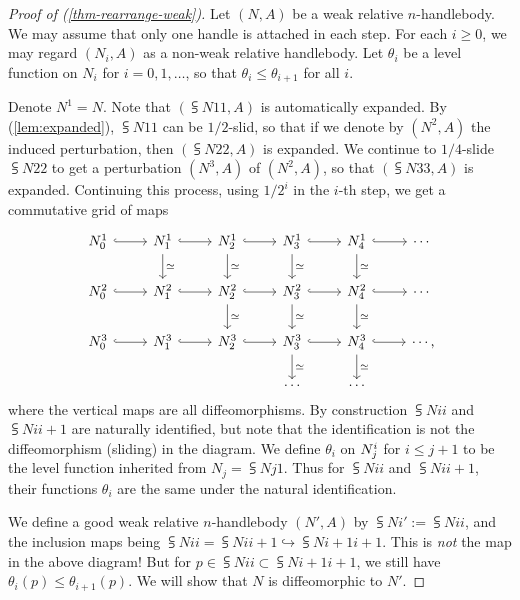 \begin{proof}[Proof of \textup{(\ref{thm-rearrange-weak})}]
Let $(N,A)$ be a weak relative $n$-handlebody.
We may assume that only one handle is attached in each step.
For each $i\geq0$, we may regard $(N_i,A)$ as a non-weak relative handlebody.
Let $\theta_i$ be a level function on $N_i$ for $i=0,1,\dotsc$,
so that $\theta_i\leq\theta_{i+1}$ for all $i$.

Denote $N^1=N$. Note that $(\subsup N11,A)$ is automatically expanded.
By (\ref{lem:expanded}),
$\subsup N11$ can be $1/2$-slid,
so that if we denote by $(N^2,A)$ the induced perturbation,
then $(\subsup N22,A)$ is expanded. 
We continue to $1/4$-slide $\subsup N22$ to get a perturbation $(N^3,A)$ of $(N^2,A)$,
so that $(\subsup N33,A)$ is expanded.
Continuing this process, using $1/2^i$ in the $i$-th step,
we get a commutative grid of maps
\[ \begin{tikzcd}
\subsup N01\ar[r,hook] &\subsup N11\ar[r,hook]\ar[d,"\simeq"] &\subsup N21\ar[r,hook]\ar[d,"\simeq"] &\subsup N31\ar[r,hook]\ar[d,"\simeq"] &\subsup N41\ar[r,hook]\ar[d,"\simeq"] &\cdots\\
\subsup N02\ar[r,hook] &\subsup N12\ar[r,hook] &\subsup N22\ar[r,hook]\ar[d,"\simeq"] &\subsup N32\ar[r,hook]\ar[d,"\simeq"] &\subsup N42\ar[r,hook]\ar[d,"\simeq"] &\cdots\\
\subsup N03\ar[r,hook] &\subsup N13\ar[r,hook] &\subsup N23\ar[r,hook] &\subsup N33\ar[r,hook]\ar[d,"\simeq"] &\subsup N43\ar[r,hook]\ar[d,"\simeq"] &\cdots\rlap,\\
&&&\dots&\dots
\end{tikzcd} \]
where the vertical maps are all diffeomorphisms.
By construction $\subsup Nii$ and $\subsup Ni{i+1}$ are naturally identified,
but note that the identification is not the diffeomorphism (sliding) in the diagram.
We define $\theta_i$ on $N_{\smash{\smash{j}}}^{i}$ for $i\leq j+1$ to be the
level function inherited from $N_j=\subsup Nj1$.
Thus for $\subsup Nii$ and $\subsup Ni{i+1}$,
their functions $\theta_i$ are the same under the natural identification.

We define a good weak relative $n$-handlebody $(N',A)$ 
by $\subsup Ni\prime:=\subsup Nii$, 
and the inclusion maps being $\subsup Nii=\subsup Ni{i+1}\hookrightarrow\subsup N{i+1}{i+1}$.
This is \emph{not} the map in the above diagram!
But for $p\in\subsup Nii\subset\subsup N{i+1}{i+1}$, we still have
$\theta_i(p)\leq\theta_{i+1}(p)$.
We will show that $N$ is diffeomorphic to $N'$. 


\end{proof}
